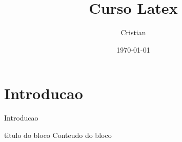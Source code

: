 \documentclass{beamer}
\title{Curso Latex}
\author{Cristian}
\date{\today}
\begin{document}
    
    \begin{frame}
        \titlepage
    \end{frame}
    
    \section{Introducao}
    \begin{frame}{Introducao}
        \begin{block}{titulo do bloco}
            Conteudo do bloco
        \end{block}
    \end{frame}
    
\end{document}
